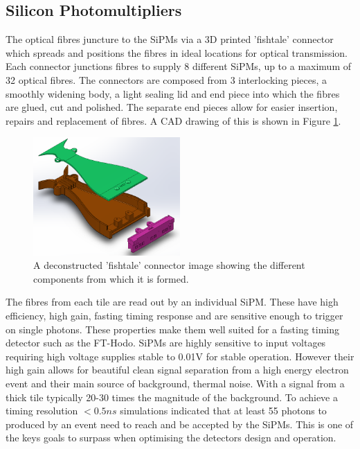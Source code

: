 \subsection{Silicon Photomultipliers}

The optical fibres juncture to the SiPMs via a 3D printed 'fishtale' connector which spreads and positions the fibres in ideal locations for optical transmission. Each connector junctions fibres to supply 8 different SiPMs, up to a maximum of 32 optical fibres. The connectors are composed from 3 interlocking pieces, a smoothly widening body, a light sealing lid and end piece into which the fibres are glued, cut and polished. The separate end pieces allow for easier insertion, repairs and replacement of fibres. A CAD drawing of this is shown in Figure \ref{FishtaleDeconstructed}.



\begin{figure}
	\centering
	\includegraphics[width=0.5\textwidth]{ImgChap1/fishtail}
	\caption{A deconstructed 'fishtale' connector image showing the different components from which it is formed.}
	\label{FishtaleDeconstructed}
\end{figure}

The fibres from each tile are read out by an individual SiPM. These have high efficiency, high gain, fasting timing response and are sensitive enough to trigger on single photons. These properties make them well suited for a fasting timing detector such as the FT-Hodo. SiPMs are highly sensitive to input voltages requiring high voltage supplies stable to 0.01V for stable operation. However their high gain allows for beautiful clean signal separation from a high energy electron event and their main source of background, thermal noise. With a signal from a thick tile typically 20-30 times the magnitude of the background. To achieve a timing resolution $<0.5ns$ simulations indicated that at least 55 photons to produced by an event need to reach and be accepted by the SiPMs. This is one of the keys goals to surpass when optimising the detectors design and operation. 

